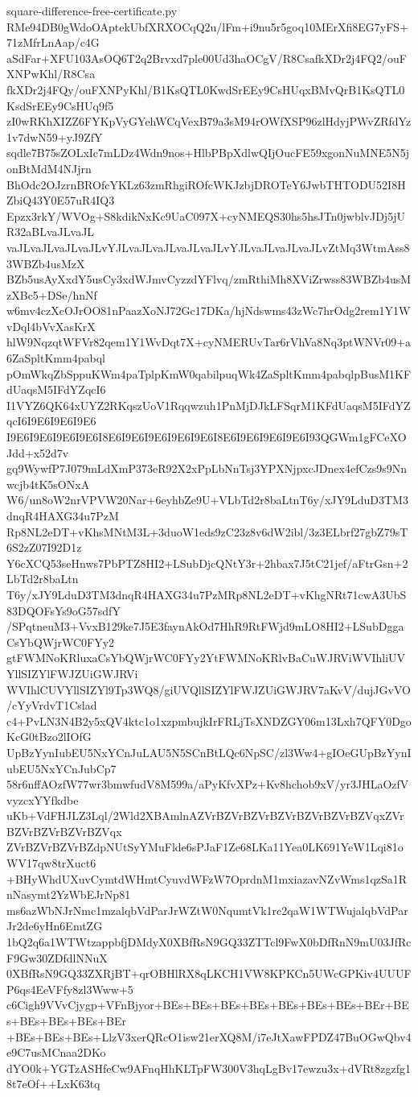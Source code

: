 \documentclass[11pt]{article}
\theoremstyle{definition}
\theoremstyle{remark}
\begin{document}
\begin{filecontents*}[overwrite]{square-difference-free-certificate.py}
RMe94DB0gWdoOAptekUbfXRXOCqQ2u/lFm+i9nu5r5goq10MErXfi8EG7yFS+71zMfrLnAap/c4G
aSdFar+XFU103AsOQ6T2q2Brvxd7ple00Ud3haOCgV/R8CsafkXDr2j4FQ2/ouFXNPwKhl/R8Csa
fkXDr2j4FQy/ouFXNPyKhl/B1KsQTL0KwdSrEEy9CsHUqxBMvQrB1KsQTL0KsdSrEEy9CsHUq9f5
zI0wRKhXIZZ6FYKpVyGYehWCqVexB79a3sM94rOWfXSP96zlHdyjPWvZRfdYz1v7dwN59+yJ9ZfY
sqdle7B75sZOLxIc7mLDz4Wdn9nos+HlbPBpXdlwQIjOucFE59xgonNuMNE5N5jonBtMdM4NJjrn
BhOdc2OJzrnBROfcYKLz63zmRhgiROfcWKJzbjDROTeY6JwbTHTODU52I8HZbiQ43Y0E57uR4IQ3
Epzx3rkY/WVOg+S8kdikNxKc9UaC097X+cyNMEQS30hs5hsJTn0jwblvJDj5jUR32aBLvaJLvaJL
vaJLvaJLvaJLvaJLvYJLvaJLvaJLvaJLvaJLvYJLvaJLvaJLvaJLvZtMq3WtmAss83WBZb4usMzX
BZb5usAyXxdY5usCy3xdWJmvCyzzdYFlvq/zmRthiMh8XViZrwss83WBZb4usMzXBc5+DSe/hnNf
w6mv4czXcOJrOO81nPaazXoNJ72Gc17DKa/hjNdswms43zWc7hrOdg2rem1Y1WvDql4bVvXasKrX
hlW9NqzqtWFVr82qem1Y1WvDqt7X+cyNMERUvTar6rVhVa8Nq3ptWNVr09+a6ZaSpltKmm4pabql
pOmWkqZbSppuKWm4paTplpKmW0qabilpuqWk4ZaSpltKmm4pabqlpBusM1KFdUaqsM5IFdYZqcI6
I1VYZ6QK64xUYZ2RKqszUoV1Rqqwzuh1PnMjDJkLFSqrM1KFdUaqsM5IFdYZqcI6I9E6I9E6I9E6
I9E6I9E6I9E6I9E6I8E6I9E6I9E6I9E6I9E6I8E6I9E6I9E6I9E6I93QGWm1gFCeXOJdd+x52d7v
gq9WywfP7J079mLdXmP373eR92X2xPpLbNnTsj3YPXNjpxcJDnex4efCzs9s9Nnwcjb4tK5sONxA
W6/un8oW2nrVPVW20Nar+6eyhbZe9U+VLbTd2r8baLtnT6y/xJY9LduD3TM3dnqR4HAXG34u7PzM
Rp8NL2eDT+vKhsMNtM3L+3duoW1eds9zC23z8v6dW2ibl/3z3ELbrf27gbZ79sT6S2zZ07I92D1z
Y6cXCQ53seHnws7PbPTZ8HI2+LSubDjcQNtY3r+2hbax7J5tC21jef/aFtrGsn+2LbTd2r8baLtn
T6y/xJY9LduD3TM3dnqR4HAXG34u7PzMRp8NL2eDT+vKhgNRt71cwA3UbS83DQOFsYs9oG57sdfY
/SPqtneuM3+VvxB129ke7J5E3faynAkOd7HhR9RtFWjd9mLO8HI2+LSubDggaCsYbQWjrWC0FYy2
gtFWMNoKRluxaCsYbQWjrWC0FYy2YtFWMNoKRlvBaCuWJRViWVIhliUVYllSIZYlFWJZUiGWJRVi
WVIhlCUVYllSIZYl9Tp3WQ8/giUVQllSIZYlFWJZUiGWJRV7aKvV/dujJGvVO/cYyVrdvT1Cslad
c4+PvLN3N4B2y5xQV4ktc1o1xzpmbujkIrFRLjTsXNDZGY06m13Lxh7QFY0DgoKcG0tBzo2lIOfG
UpBzYynIubEU5NxYCnJuLAU5N5SCnBtLQc6NpSC/zl3Ww4+gIOeGUpBzYynIubEU5NxYCnJubCp7
58r6nffAOzfW77wr3bmwfudV8M599a/aPyKfvXPz+Kv8hchob9xV/yr3JHLaOzfVvyzcxYYfkdbe
uKb+VdFHJLZ3Lql/2Wld2XBAmlnAZVrBZVrBZVrBZVrBZVrBZVrBZVqxZVrBZVrBZVrBZVrBZVqx
ZVrBZVrBZVrBZdpNUtSyYMuFlde6sPJaF1Ze68LKa11Yea0LK691YeW1Lqi81oWV17qw8trXuct6
+BHyWhdUXuvCymtdWHmtCyuvdWFzW7OprdnM1mxiazavNZvWms1qzSa1RnNasymt2YzWbEJrNp81
ms6azWbNJrNmc1mzalqbVdParJrWZtW0NqumtVk1rc2qaW1WTWujalqbVdParJr2de6yHn6EmtZG
1bQ2q6a1WTWtzappbfjDMdyX0XBfRsN9GQ33ZTTcl9FwX0bDfRnN9mU03JfRcF9Gw30ZDfdlNNuX
0XBfRsN9GQ33ZXRjBT+qrOBHlRX8qLKCH1VW8KPKCn5UWcGPKiv4UUUFP6qs4EeVFfy8zl3Www+5
c6Cigh9VVvCjygp+VFnBjyor+BEs+BEs+BEs+BEs+BEs+BEs+BEs+BEr+BEs+BEs+BEs+BEs+BEr
+BEs+BEs+BEs+LlzV3xerQRcO1isw21erXQ8M/i7eJtXawFPDZ47BuOGwQbv4e9C7usMCnaa2DKo
dYO0k+YGTzASHfeCw9AFnqHhKLTpFW300V3hqLgBv17ewzu3x+dVRt8zgzfg18t7eOf++LxK63tq

\end{filecontents*}
\end{document}
